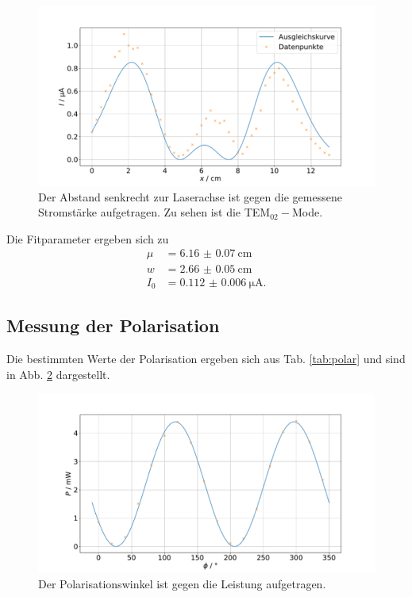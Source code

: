 \begin{figure}
    \centering
    \includegraphics[width=15cm]{plots/mode2.pdf}
    \caption{Der Abstand senkrecht zur Laserachse ist gegen die gemessene Stromstärke aufgetragen. Zu sehen ist die TEM$_{02}-$Mode.}
    \label{fig:mode2}
\end{figure}

Die Fitparameter ergeben sich zu 
\begin{align*}
    \mu &= \SI{6.16(7)}{\centi\meter} \\
    w &= \SI{2.66(5)}{\centi\meter} \\ 
    I_0 &= \SI{0.112(6)}{\micro\ampere}.
\end{align*}

\subsection{Messung der Polarisation}

Die bestimmten Werte der Polarisation ergeben sich aus Tab. \ref{tab:polar} und sind in Abb. \ref{fig:polarisation} dargestellt. 


\begin{figure}
    \centering
    \includegraphics[width=15cm]{plots/polarisation.pdf}
    \caption{Der Polarisationswinkel ist gegen die Leistung aufgetragen.}
    \label{fig:polarisation}
\end{figure}    

